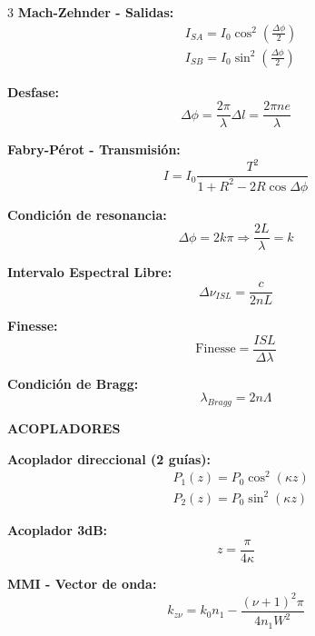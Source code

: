 \documentclass[10pt,a4paper,landscape]{article}
\newcommand{\secbox}[1]{\colorbox{blue!20}{\textbf{#1}}}
\begin{document}
\begin{multicols}{3}
\textbf{Mach-Zehnder - Salidas:}
\begin{align*}
&\boxed{I_{SA} = I_0 \cos^2\left(\frac{\Delta\phi}{2}\right)}\\
&\boxed{I_{SB} = I_0 \sin^2\left(\frac{\Delta\phi}{2}\right)}
\end{align*}

\textbf{Desfase:}
\begin{equation*}
\boxed{\Delta\phi = \frac{2\pi}{\lambda}\Delta l = \frac{2\pi n e}{\lambda}}
\end{equation*}

\textbf{Fabry-Pérot - Transmisión:}
\begin{equation*}
\boxed{I = I_0 \frac{T^2}{1 + R^2 - 2R\cos\Delta\phi}}
\end{equation*}

\textbf{Condición de resonancia:}
\begin{equation*}
\boxed{\Delta\phi = 2k\pi \Rightarrow \frac{2L}{\lambda} = k}
\end{equation*}

\textbf{Intervalo Espectral Libre:}
\begin{equation*}
\boxed{\Delta\nu_{ISL} = \frac{c}{2nL}}
\end{equation*}

\textbf{Finesse:}
\begin{equation*}
\boxed{\text{Finesse} = \frac{ISL}{\Delta\lambda}}
\end{equation*}

\textbf{Condición de Bragg:}
\begin{equation*}
\boxed{\lambda_{Bragg} = 2n\Lambda}
\end{equation*}

\secbox{ACOPLADORES}

\textbf{Acoplador direccional (2 guías):}
\begin{align*}
&\boxed{P_1(z) = P_0 \cos^2(\kappa z)}\\
&\boxed{P_2(z) = P_0 \sin^2(\kappa z)}
\end{align*}

\textbf{Acoplador 3dB:}
\begin{equation*}
\boxed{z = \frac{\pi}{4\kappa}}
\end{equation*}

\textbf{MMI - Vector de onda:}
\begin{equation*}
\boxed{k_{z\nu} = k_0 n_1 - \frac{(\nu+1)^2 \pi}{4n_1 W^2}}
\end{equation*}


\end{multicols}
\end{document}
